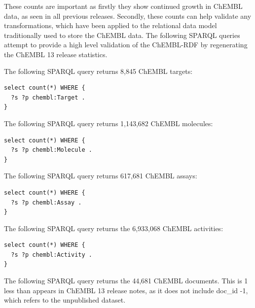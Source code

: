 \documentclass[10pt]{bmc_article}
\newenvironment{bmcformat}{\begin{raggedright}\baselineskip20pt\sloppy\setboolean{publ}{false}}{\end{raggedright}\baselineskip20pt\sloppy}
\begin{document}
\begin{bmcformat}
These counts are important as firstly they show continued growth in ChEMBL data, as seen 
in all previous releases. Secondly, these counts can help validate any transformations, 
which have been applied to the relational data model traditionally used to store the ChEMBL 
data. The following SPARQL queries attempt to provide a high level validation of the 
ChEMBL-RDF by regenerating the ChEMBL 13 release statistics.

The following SPARQL query returns 8,845 ChEMBL targets:
     
\begin{small}
\begin{verbatim}
select count(*) WHERE {
  ?s ?p chembl:Target .
}
\end{verbatim}
\end{small}

The following SPARQL query returns 1,143,682 ChEMBL molecules:


\begin{small}
\begin{verbatim}
select count(*) WHERE {
  ?s ?p chembl:Molecule .
}
\end{verbatim}
\end{small}

The following SPARQL query returns 617,681 ChEMBL assays:

\begin{small}
\begin{verbatim}
select count(*) WHERE {
  ?s ?p chembl:Assay .
}
\end{verbatim}
\end{small}

The following SPARQL query returns the 6,933,068 ChEMBL activities:

\begin{small}
\begin{verbatim}
select count(*) WHERE {
  ?s ?p chembl:Activity .
}
\end{verbatim}
\end{small}

The following SPARQL query returns the 44,681 ChEMBL documents. This is 1 less than appears 
in ChEMBL 13 release notes, as it does not include doc\_id -1, which refers to the 
unpublished dataset.


\end{bmcformat}
\end{document}
